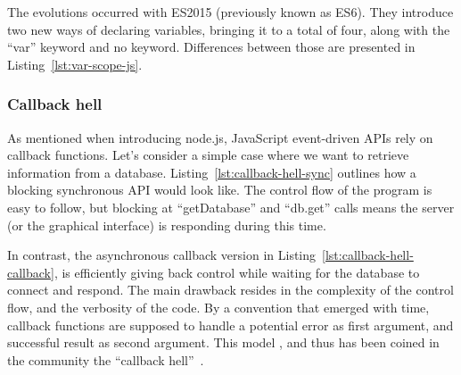 
The  evolutions occurred with ES2015 (previously known as ES6).
They introduce two new ways of declaring variables, bringing it to a total of four,
along with the ``var'' keyword and no keyword.
Differences between those are presented in Listing~\ref{lst:var-scope-js}.





\subsubsection{Callback hell}%
\label{ssub:callback_hell}

As mentioned when introducing node.js,
JavaScript event-driven APIs rely on callback functions.
Let's consider a simple case where we want to retrieve information
from a database.
Listing~\ref{lst:callback-hell-sync} outlines how a blocking synchronous API
would look like.
The control flow of the program is easy to follow,
but blocking at ``getDatabase'' and ``db.get'' calls
means the server (or the graphical interface) is  responding
during this time.



In contrast, the asynchronous callback version
in Listing~\ref{lst:callback-hell-callback},
is efficiently giving back control while waiting for the
database to connect and respond.
The main drawback resides in the complexity of the control flow,
and the verbosity of the code.
By a convention that emerged with time,
callback functions are supposed to handle a potential error
as first argument, and successful result as second argument.
This model ,
and thus has been coined in the community the ``callback hell''~\cite{callback-hell}.

